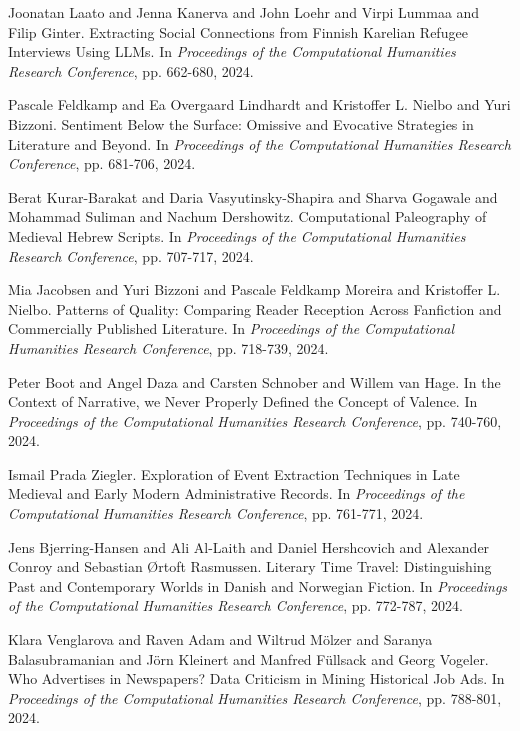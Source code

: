 \begin{thebibliography}{99}
 Joonatan Laato and Jenna Kanerva and John Loehr and Virpi Lummaa and Filip Ginter. {E}xtracting {S}ocial {C}onnections from {F}innish {K}arelian {R}efugee {I}nterviews {U}sing {L}LMs. In \textit{Proceedings of the Computational Humanities Research Conference}, pp. 662-680, 2024.

 Pascale Feldkamp and Ea Overgaard Lindhardt and Kristoffer L. Nielbo and Yuri Bizzoni. {S}entiment {B}elow the {S}urface: {O}missive and {E}vocative {S}trategies in {L}iterature and {B}eyond. In \textit{Proceedings of the Computational Humanities Research Conference}, pp. 681-706, 2024.

 Berat Kurar-Barakat and Daria Vasyutinsky-Shapira and Sharva Gogawale and Mohammad Suliman and Nachum Dershowitz. {C}omputational {P}aleography of {M}edieval {H}ebrew {S}cripts. In \textit{Proceedings of the Computational Humanities Research Conference}, pp. 707-717, 2024.

 Mia Jacobsen and Yuri Bizzoni and Pascale Feldkamp Moreira and Kristoffer L. Nielbo. {P}atterns of {Q}uality: {C}omparing {R}eader {R}eception {A}cross {F}anfiction and {C}ommercially {P}ublished {L}iterature. In \textit{Proceedings of the Computational Humanities Research Conference}, pp. 718-739, 2024.

 Peter Boot and Angel Daza and Carsten Schnober and Willem van Hage. {I}n the {C}ontext of {N}arrative, we {N}ever {P}roperly {D}efined the {C}oncept of {V}alence. In \textit{Proceedings of the Computational Humanities Research Conference}, pp. 740-760, 2024.

 Ismail Prada Ziegler. {E}xploration of {E}vent {E}xtraction {T}echniques in {L}ate {M}edieval and {E}arly {M}odern {A}dministrative {R}ecords. In \textit{Proceedings of the Computational Humanities Research Conference}, pp. 761-771, 2024.

 Jens Bjerring-Hansen and Ali Al-Laith and Daniel Hershcovich and Alexander Conroy and Sebastian {\O}rtoft Rasmussen. {L}iterary {T}ime {T}ravel: {D}istinguishing {P}ast and {C}ontemporary {W}orlds in {D}anish and {N}orwegian {F}iction. In \textit{Proceedings of the Computational Humanities Research Conference}, pp. 772-787, 2024.

 Klara Venglarova and Raven Adam and Wiltrud M{\"o}lzer and Saranya Balasubramanian and J{\"o}rn Kleinert and Manfred F{\"u}llsack and Georg Vogeler. {W}ho {A}dvertises in {N}ewspapers? {D}ata {C}riticism in {M}ining {H}istorical {J}ob {A}ds. In \textit{Proceedings of the Computational Humanities Research Conference}, pp. 788-801, 2024.


\end{thebibliography}
